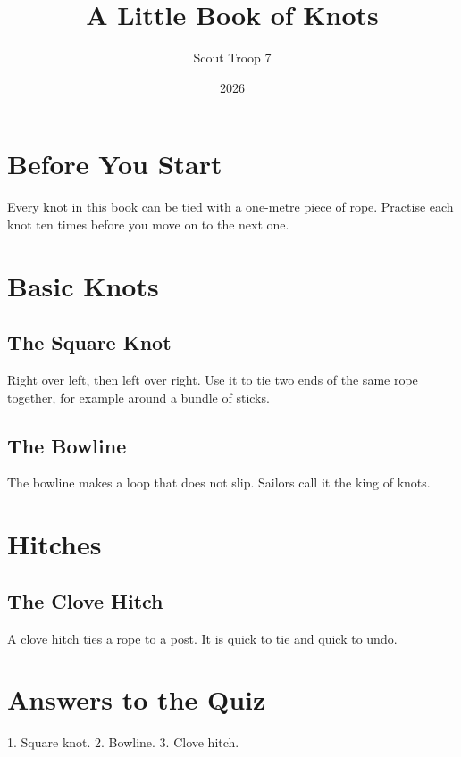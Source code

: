 \documentclass{book}
\title{A Little Book of Knots}
\author{Scout Troop 7}
\date{2026}
\begin{document}
\maketitle

\tableofcontents

\chapter{Before You Start}
Every knot in this book can be tied with a one-metre piece of rope.
Practise each knot ten times before you move on to the next one.

\chapter{Basic Knots}

\section{The Square Knot}
Right over left, then left over right. Use it to tie two ends of the
same rope together, for example around a bundle of sticks.

\section{The Bowline}
The bowline makes a loop that does not slip. Sailors call it the king
of knots.

\chapter{Hitches}

\section{The Clove Hitch}
A clove hitch ties a rope to a post. It is quick to tie and quick to
undo.

\chapter{Answers to the Quiz}
1. Square knot. 2. Bowline. 3. Clove hitch.
\end{document}
